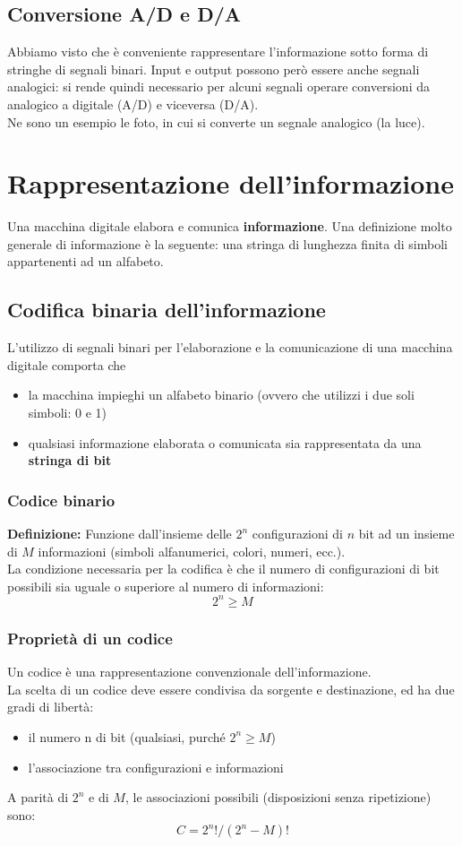 \documentclass{article}
\begin{document}
\subsection{Conversione A/D e D/A}
Abbiamo visto che è conveniente rappresentare l’informazione sotto forma di stringhe di segnali binari. Input e output possono però essere anche segnali analogici: si rende quindi necessario per alcuni segnali operare conversioni da analogico a digitale (A/D) e viceversa (D/A).\\
Ne sono un esempio le foto, in cui si converte un segnale analogico (la luce).
\section{Rappresentazione dell'informazione}
Una macchina digitale elabora e comunica \textbf{informazione}. Una definizione molto generale di informazione è la seguente: una stringa di lunghezza finita di simboli appartenenti ad un alfabeto.
\subsection{Codifica binaria dell'informazione}
L’utilizzo di segnali binari per l’elaborazione e la comunicazione di una macchina digitale comporta che
\begin{itemize}
    \item la macchina impieghi un alfabeto binario (ovvero che utilizzi i due soli simboli: 0 e 1)
    \item qualsiasi informazione elaborata o comunicata sia rappresentata da una \textbf{stringa di bit}
\end{itemize}
\subsubsection{Codice binario}
\textbf{Definizione:} Funzione dall’insieme delle $2^n$ configurazioni di $n$ bit ad un insieme di $M$ informazioni (simboli alfanumerici, colori, numeri, ecc.).
\vspace{0.2cm}\\
La condizione necessaria per la codifica è che il numero di configurazioni di bit possibili sia uguale o superiore al numero di informazioni:
$$ 2^n \geq M $$
\subsubsection*{Proprietà di un codice}
Un codice è una rappresentazione convenzionale dell'informazione. \\
La scelta di un codice deve essere condivisa da sorgente e destinazione, ed ha due gradi di libertà:
\begin{itemize}
    \item il numero n di bit (qualsiasi, purché $2^n \geq M$)
    \item l’associazione tra configurazioni e informazioni
\end{itemize}
\vspace{0.2cm}
A parità di $2^n$ e di $M$, le associazioni possibili (disposizioni senza ripetizione) sono:
$$ C = 2^n! / (2^n - M)! $$
\end{document}
